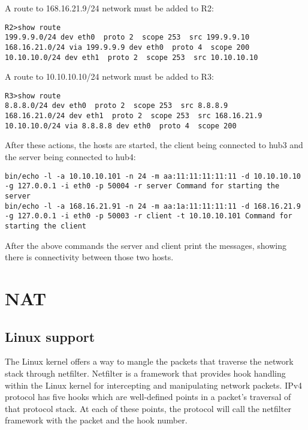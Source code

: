 {{A route to 168.16.21.9/24 network must be added to R2:
\lstset{language=TeX, caption=R2 routing table}
\begin{lstlisting}
R2>show route  
199.9.9.0/24 dev eth0  proto 2  scope 253  src 199.9.9.10 
168.16.21.0/24 via 199.9.9.9 dev eth0  proto 4  scope 200 
10.10.10.0/24 dev eth1  proto 2  scope 253  src 10.10.10.10
\end{lstlisting}

A route to 10.10.10.10/24 network must be added to R3:
\lstset{language=TeX, caption=R3 routing table}
\begin{lstlisting}
R3>show route  
8.8.8.0/24 dev eth0  proto 2  scope 253  src 8.8.8.9 
168.16.21.0/24 dev eth1  proto 2  scope 253  src 168.16.21.9 
10.10.10.0/24 via 8.8.8.8 dev eth0  proto 4  scope 200
\end{lstlisting}

After these actions, the hosts are started, the client being connected to hub3 and the server being connected to hub4:
\lstset{language=TeX, caption=Commands issued for starting client and server}
\begin{lstlisting}
bin/echo -l -a 10.10.10.101 -n 24 -m aa:11:11:11:11:11 -d 10.10.10.10 -g 127.0.0.1 -i eth0 -p 50004 -r server Command for starting the server
bin/echo -l -a 168.16.21.91 -n 24 -m aa:1a:11:11:11:11 -d 168.16.21.9 -g 127.0.0.1 -i eth0 -p 50003 -r client -t 10.10.10.101 Command for starting the client
\end{lstlisting}
After the above commands the server and client print the messages, showing there is connectivity between those two hosts.
\section{NAT}
\label{sub-sec:nat-impl}

\subsection{Linux support}
\label{sub-sec:nat-linux}
The Linux kernel offers a way to mangle the packets that traverse the network stack through netfilter. 
Netfilter is a framework that provides hook handling within the Linux kernel for intercepting and 
manipulating network packets. IPv4 protocol has five hooks which are well-defined points in a packet's 
traversal of that protocol stack. At each of these points, the protocol will call the netfilter framework 
with the packet and the hook number.

}}
